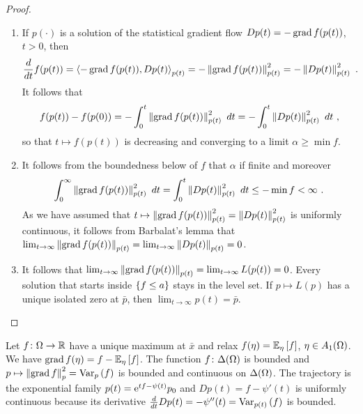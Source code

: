 \documentclass[12pt,a4paper]{amsart}
\begin{document}
\begin{proof}
\begin{enumerate}
\item   If $p(\cdot)$ is a solution of the statistical gradient flow $Dp(t) = - \grad f(p(t))$, $t > 0$, then 
%
  \begin{equation*}
    \derivby t f(p(t)) = \scalarat {p(t)} {- \grad f(p(t))} {Dp(t)} = - \normat {p(t)} {\grad f(p(t))} ^2 = - \normat {p(t)} {Dp(t)} ^2 \ .
  \end{equation*}
%
It follows that 
%
\begin{equation*}
  f(p(t)) - f(p(0)) =  - \int_0^t \normat {p(t)} {\grad f(p(t))} ^2 \ dt = - \int_0^t \normat {p(t)} {Dp(t)} ^2 \ dt \ ,
\end{equation*}
%
so that $t \mapsto f(p(t))$ is decreasing and converging to a limit $\alpha \ge \min f$. 
\item It follows from the boundedness below of $f$ that $\alpha$ if finite and moreover
%
\begin{equation*}
 \int_0^\infty \normat {p(t)} {\grad f(p(t))} ^2 \ dt =  \int_0^t \normat {p(t)} {Dp(t)} ^2 \ dt \le - \min f < \infty \ .
\end{equation*}
%
As we have assumed that $t \mapsto \normat {p(t)} {\grad f(p(t))} ^2 = \normat {p(t)} {Dp(t)} ^2$ is uniformly continuous, it follows from Barbalat's lemma that $\lim_{t \to \infty} \normat {p(t)} {\grad f(p(t))} = \lim_{t \to \infty} \normat {p(t)} {Dp(t)} = 0$. 
\item It follows that $\lim_{t \to \infty} \normat {p(t)} {\grad f(p(t))} = \lim_{t \to \infty} L(p(t)) = 0$. Every solution that starts inside $\set{f \le a}$ stays in the level set. If $p \mapsto L(p)$ has a unique isolated zero at $\bar p$, then $\lim_{t\to\infty} p(t) = \bar p$.
\end{enumerate}
\end{proof}

\begin{example}
  Let $f \colon \Omega \to \reals$ have a unique maximum at $\bar x$ and relax $f(\eta) = \expectat \eta f$, $\eta \in \AffineO$. We have $\grad f(\eta) = f - \expectat \eta f$. The function $f \colon \SimO$ is bounded and $p \mapsto \normat p {\grad f}^2 = \varat p f$ is bounded and continuous on $\SimO$. The trajectory is the exponential family $p(t) = \euler^{tf - \psi(t)} p_0$ and $Dp(t) = f - \psi'(t)$ is uniformly continuous because its derivative $\derivby t Dp(t) = - \psi''(t) = \varat {p(t)} f$ is bounded.
\end{example}
\end{document}
